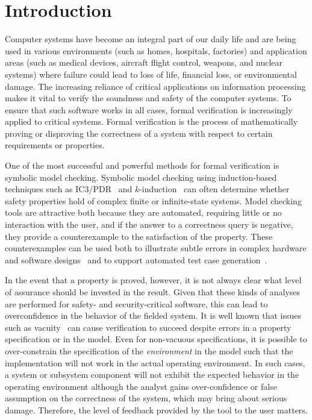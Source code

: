 \chapter{Introduction}
\label{ch:intro}
Computer systems have become an integral part of our daily life and are being used in various environments (such as homes, hospitals, factories) and application areas (such as medical devices, aircraft flight control, weapons, and nuclear systems) where failure could lead to loss of life, financial loss, or environmental damage. The increasing reliance of critical applications on information processing makes it vital to verify the soundness and safety of the computer systems. To ensure that such software works in all cases, formal verification is increasingly applied to critical systems. Formal verification is the process of mathematically proving or disproving the correctness of a system with respect to certain requirements or properties.

One of the most successful and powerful methods for formal verification is symbolic model checking. Symbolic model checking using induction-based techniques such as IC3/PDR~\cite{Een2011:PDR} and $k$-induction~\cite{SheeranSS00} can often determine whether safety properties hold of complex finite or infinite-state systems.  Model checking tools are attractive both because they are automated, requiring little or no interaction with the user, and if the answer to a correctness query is negative, they provide a counterexample to the satisfaction of the property.  These counterexamples can be used both to illustrate subtle errors in complex hardware and software designs~\cite{hilt2013,McMillan99:compositional, Miller10:CACM} and to support automated test case generation~\cite{Whalen13:OMCDC, You15:dse}.

In the event that a property is proved, however, it is not always clear what level of assurance should be invested in the result.  Given that these kinds of analyses are performed for safety- and security-critical software, this can lead to overconfidence in the behavior of the fielded system.  It is well known that issues such as vacuity~\cite{Kupferman03:Vacuity} can cause verification to succeed despite errors in a property specification or in the model. Even for non-vacuous specifications, it is possible to over-constrain the specification of the {\em environment} in the model such that the implementation will not work in the actual operating environment.
In such cases, a system or subsystem component will not exhibit the expected behavior in the operating environment although the analyst gains over-confidence or false assumption on the correctness of the system, which may bring about serious damage. Therefore, the level of feedback provided by the tool to the user matters.

